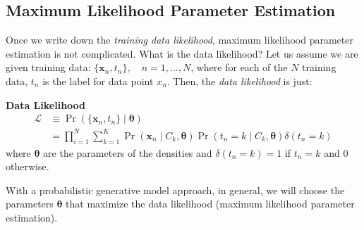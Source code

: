 \documentclass[11pt]{article}
\newcommand{\xb}{\mathbf{x}}
\newenvironment{propertybox}{%
   \def\FrameCommand{\colorbox{LightSteelBlue}}%
   \MakeFramed{\advance\hsize-\width \FrameRestore}}
 {\endMakeFramed}
\begin{document}
\subsection{Maximum Likelihood Parameter Estimation}
Once we write down the \textit{training data likelihood}, maximum likelihood parameter estimation is not complicated. What is the data likelihood? Let us assume we are given training data: $\lbrace \xb_n, t_n \rbrace, \quad n = 1, \ldots, N$, where for each of the $N$ training data, $t_n$ is the label for data point $x_n$. Then, the \textit{data likelihood} is just:
\begin{center}
\begin{minipage}{0.75\linewidth}
\begin{propertybox}
    \textbf{Data Likelihood}
    \begin{equation}
    	\begin{split}
	    	\mathcal{L} &\equiv \Pr \left( \lbrace\xb_n, t_n\rbrace \mid \symbf{\theta} \right)  \\
		 	&= \prod_{i=1}^{N} \sum_{k=1}^K \Pr \left( \xb_n \mid C_k , \symbf{\theta} \right) \Pr \left( t_n = k \mid C_k, \symbf{\theta}\right) \delta(t_n = k)
	\end{split}
    \end{equation}
    where $\symbf{\theta}$ are the parameters of the densities and $\delta(t_n = k) = 1$ if $t_n = k$ and $0$ otherwise.
\end{propertybox}
\end{minipage}
\end{center}


With a probabilistic generative model approach, in general, we will choose the parameters $\symbf{\theta}$ that maximize the data likelihood (maximum likelihood parameter estimation).
\end{document}
